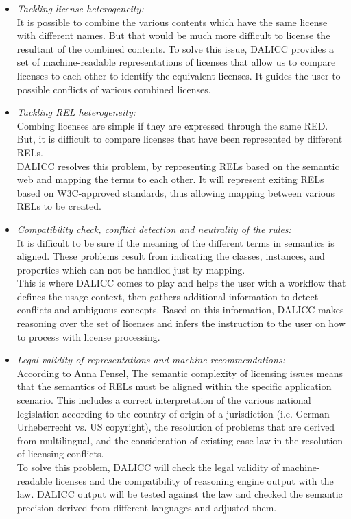 \begin{itemize}
	\item \textit{Tackling license heterogeneity:} \\
	It is possible to combine the various contents which have the same license with different names. But that would be much more difficult to license the resultant of the combined contents. To solve this issue, DALICC provides a set of machine-readable representations of licenses that allow us to compare licenses to each other to identify the equivalent licenses. It guides the user to possible conflicts of various combined licenses.
	\item \textit{Tackling REL heterogeneity:} \\
	Combing licenses are simple if they are expressed through the same RED. But, it is difficult to compare licenses that have been represented by different RELs.\\
	DALICC resolves this problem, by representing RELs based on the semantic web and mapping the terms to each other. It will represent exiting RELs based on  W3C-approved standards, thus allowing mapping between various RELs to be created.
	\item \textit{Compatibility check, conflict detection and neutrality of the rules:} \\
	It is difficult to be sure if the meaning of the different terms in semantics is aligned. These problems result from indicating the classes, instances, and properties which can not be handled just by mapping.\\
	This is where DALICC comes to play and helps the user with a workflow that defines the usage context, then gathers additional information to detect conflicts and ambiguous concepts. Based on this information, DALICC makes reasoning over the set of licenses and infers the instruction to the user on how to process with license processing.\\
	\item \textit{Legal validity of representations and machine recommendations:} \\
	According to Anna Fensel\cite{Anna}, The semantic complexity of licensing issues means that the semantics of RELs must be aligned within the specific application scenario. This includes a correct interpretation of the various national legislation according to the country of origin of a jurisdiction (i.e. German Urheberrecht vs. US copyright), the resolution of problems that are derived from multilingual, and the consideration of existing case law in the resolution of licensing conflicts.\cite{Anna}\\
	To solve this problem, DALICC will check the legal validity of machine-readable licenses and the compatibility of reasoning engine output with the law. DALICC output will be tested against the law and checked the semantic precision derived from different languages and adjusted them\cite{Anna}.
	
\end{itemize}
